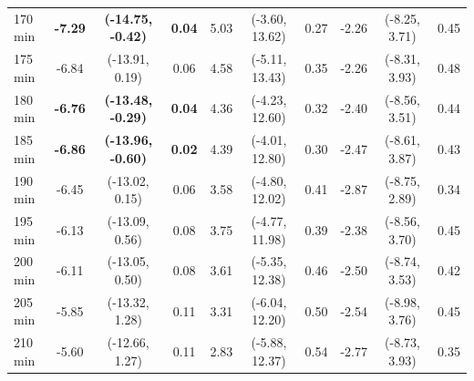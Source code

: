 \begin{table}[ht]
{\begin{tabular}{lccccccccc}
170 min & \textbf{-7.29} & \textbf{(-14.75, -0.42)} & \textbf{0.04} & 5.03 & (-3.60, 13.62) & 0.27 & -2.26 & (-8.25, 3.71) & 0.45 \\
175 min & -6.84 & (-13.91, 0.19) & 0.06 & 4.58 & (-5.11, 13.43) & 0.35 & -2.26 & (-8.31, 3.93) & 0.48 \\
180 min & \textbf{-6.76} & \textbf{(-13.48, -0.29)} & \textbf{0.04} & 4.36 & (-4.23, 12.60) & 0.32 & -2.40 & (-8.56, 3.51) & 0.44 \\
185 min & \textbf{-6.86} & \textbf{(-13.96, -0.60)} & \textbf{0.02} & 4.39 & (-4.01, 12.80) & 0.30 & -2.47 & (-8.61, 3.87) & 0.43 \\
190 min & -6.45 & (-13.02, 0.15) & 0.06 & 3.58 & (-4.80, 12.02) & 0.41 & -2.87 & (-8.75, 2.89) & 0.34 \\
195 min & -6.13 & (-13.09, 0.56) & 0.08 & 3.75 & (-4.77, 11.98) & 0.39 & -2.38 & (-8.56, 3.70) & 0.45 \\
200 min & -6.11 & (-13.05, 0.50) & 0.08 & 3.61 & (-5.35, 12.38) & 0.46 & -2.50 & (-8.74, 3.53) & 0.42 \\
205 min & -5.85 & (-13.32, 1.28) & 0.11 & 3.31 & (-6.04, 12.20) & 0.50 & -2.54 & (-8.98, 3.76) & 0.45 \\
210 min & -5.60 & (-12.66, 1.27) & 0.11 & 2.83 & (-5.88, 12.37) & 0.54 & -2.77 & (-8.73, 3.93) & 0.35 \\
\bottomrule
\end{tabular}%
}
\end{table}
